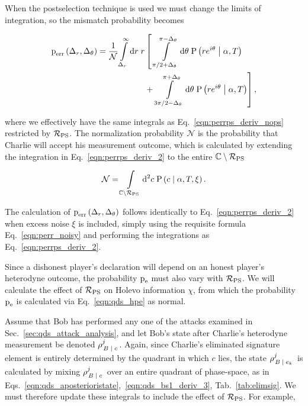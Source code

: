 \noindent When the postselection technique is used we must change the limits of integration, so the mismatch probability becomes

\begin{align}\label{eqn:perrps_deriv_2}
\perr\left(\Delta_r, \Delta_\theta\right) %
= \frac{1}{\mathcal{N}} \int\limits_{\Delta_r}^{\infty} \mathrm{d}r \; r &\left[ \; \int\limits_{ \pi/2 + \Delta_\theta}^{\pi - \Delta_\theta} \mathrm{d}\theta \; \text{P}\left(r e^{i \theta} \given \alpha, T\right) \right. \notag \\
%
 &+ \left. \int\limits_{3 \pi/2 - \Delta_\theta}^{\pi + \Delta_\theta} \mathrm{d}\theta \; \text{P}\left(r e^{i \theta} \given \alpha, T\right) \right],
\end{align}


\noindent where we effectively have the same integrals as Eq.~\ref{eqn:perrps_deriv_nops} restricted by $\mathcal{R}_{\text{PS}}$. The normalization probability $\mathcal{N}$ is the probability that Charlie will accept his measurement outcome, which is calculated by extending the integration in Eq.~\ref{eqn:perrps_deriv_2} to the entire $\mathbb{C} \setminus \mathcal{R}_{\text{PS}}$

\begin{equation}\label{eqn:qds_perrps_normalization}
\mathcal{N} = \int\limits_{\mathbb{C} \setminus \mathcal{R}_{\text{PS}}} \mathop{}\!\mathrm{d^2} c \; \text{P}\left(c \; \middle| \; \alpha, T, \xi \right).
\end{equation}

\noindent The calculation of $\text{p}_{\text{err}}\left(\Delta_r, \Delta_\theta\right)$ follows identically to Eq.~\ref{eqn:perrps_deriv_2} when excess noise $\xi$ is included, simply using the requisite formula Eq.~\ref{eqn:perr_noisy} and performing the integrations as Eq.~\ref{eqn:perrps_deriv_2}.


Since a dishonest player's declaration will depend on an honest player's heterodyne outcome, the probability $\text{p}_{\text{e}}$ must also vary with $\mathcal{R}_{\text{PS}}$. We will calculate the effect of $\mathcal{R}_{\text{PS}}$ on Holevo information $\chi$, from which the probability $\text{p}_{\text{e}}$ is calculated via Eq.~\ref{eqn:qds_hpe} as normal.

Assume that Bob has performed any one of the attacks examined in Sec.~\ref{sec:qds_attack_analysis}, and let Bob's state after Charlie's heterodyne measurement be denoted $\rho_{\left. B \; \middle| \; c\right.}^j$. Again, since Charlie's eliminated signature element is entirely determined by the quadrant in which $c$ lies, the state $\rho_{\left. B \; \middle| \;  e_k\right.}^j$ is calculated by mixing $\rho_{\left.B \; \middle| \; c\right.}^j$ over an entire quadrant of phase-space, as in Eqs.~\ref{eqn:qds_aposterioristate},~\ref{eqn:qds_bs1_deriv_3}, Tab.~\ref{tab:elimsig}. We must therefore update these integrals to include the effect of $\mathcal{R}_{\text{PS}}$. For example,

